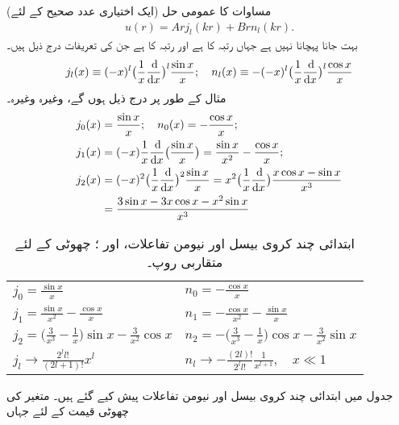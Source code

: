 (ایک اختیاری عدد صحیح  کے لئے) مساوات  کا عمومی حل
\begin{align}
u(r)=Arj_{l}(kr)+Brn_{l}(kr). 
\end{align}
 بہت جانا پہچانا نہیں ہے  جہاں  رتبہ  کا   ہے اور  رتبہ  کا    ہے جن کی تعریفات درج ذیل ہیں۔  
\begin{align}
j_{l}(x)\equiv(-x)^{l}\big(\frac{1}{x}\frac{\dif}{\dif x}\big)^{l}\frac{\sin x}{x};\quad n_{l}(x)\equiv-(-x)^{l}
\big(\frac{1}{x}\frac{\dif}{\dif x}\big)^{l}\frac{\cos x}{x}
\end{align}
مثال کے طور پر درج ذیل ہوں گے، وغیرہ وغیرہ۔
\begin{align*}
j_{0}(x)&=\frac{\sin x}{x};\quad n_{0}(x)=-\frac{\cos x}{x};\\
j_1(x)&=(-x)\frac{1}{x}\frac{\dif}{\dif x}\big(\frac{\sin x}{x}\big)=\frac{\sin x}{x^{2}}-\frac{\cos x}{x};\\
j_{2}(x)&=(-x)^{2}\big(\frac{1}{x}\frac{\dif}{\dif x}\big)^{2}\frac{\sin x}{x}=x^{2}\big(\frac{1}{x}\frac{\dif}{\dif x}\big)\frac{x\cos x-\sin x}{x^{3}}\\
&=\frac{3\sin x-3x\cos x-x^2\sin x}{x^{3}}
\end{align*}
\begin{table}
\caption{
ابتدائی چند کروی بیسل اور نیومن تفاعلات،  اور ؛ چھوٹی  کے لئے متقاربی روپ۔
}
\label{جدول_ابعادی_کروی_بیسل_نیومن_تفاعلات}
\centering
\renewcommand{\arraystretch}{2} 
\begin{tabular}{ll}
$j_0=\frac{\sin x}{x}$  &  $n_0=-\frac{\cos x}{x}$\\
$j_1=\frac{\sin x}{x^2}-\frac{\cos x}{x}$  &  $n_1=-\frac{\cos x}{x^2}-\frac{\sin x}{x}$\\
$j_2=\big(\frac{3}{x^3}-\frac{1}{x}\big)\sin x-\frac{3}{x^2}\cos x$  &  $n_2=-\big(\frac{3}{x^3}-\frac{1}{x}\big)\cos x-\frac{3}{x^2}\sin x$\\[0.5em]
\hline
$j_l\to\frac{2^l l!}{(2l+1)!}x^l$  &  $n_l\to -\frac{(2l)!}{2^ll!}\frac{1}{x^{l+1}},\quad x\ll 1$
\end{tabular}
\end{table}
جدول  میں ابتدائی چند کروی بیسل اور نیومن تفاعلات پیش کیے گئے ہیں۔ متغیر  کی چھوٹی قیمت کے لئے جہاں
